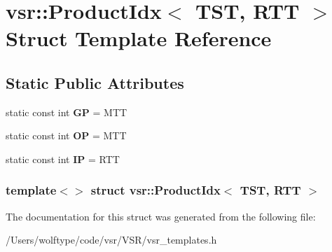 \hypertarget{structvsr_1_1_product_idx_3_01_t_s_t_00_01_r_t_t_01_4}{\section{vsr\-:\-:Product\-Idx$<$ T\-S\-T, R\-T\-T $>$ Struct Template Reference}
\label{structvsr_1_1_product_idx_3_01_t_s_t_00_01_r_t_t_01_4}
}
\subsection*{Static Public Attributes}
\begin{DoxyCompactItemize}
\item 
\hypertarget{structvsr_1_1_product_idx_3_01_t_s_t_00_01_r_t_t_01_4_a0a292b51b55583fc301d120e82985b65}{static const int {\bfseries G\-P} = M\-T\-T}\label{structvsr_1_1_product_idx_3_01_t_s_t_00_01_r_t_t_01_4_a0a292b51b55583fc301d120e82985b65}

\item 
\hypertarget{structvsr_1_1_product_idx_3_01_t_s_t_00_01_r_t_t_01_4_a2d4577cb25bcab188306510015ed4371}{static const int {\bfseries O\-P} = M\-T\-T}\label{structvsr_1_1_product_idx_3_01_t_s_t_00_01_r_t_t_01_4_a2d4577cb25bcab188306510015ed4371}

\item 
\hypertarget{structvsr_1_1_product_idx_3_01_t_s_t_00_01_r_t_t_01_4_a00322c7c9378b34ee87c743900a97aea}{static const int {\bfseries I\-P} = R\-T\-T}\label{structvsr_1_1_product_idx_3_01_t_s_t_00_01_r_t_t_01_4_a00322c7c9378b34ee87c743900a97aea}

\end{DoxyCompactItemize}
\subsubsection*{template$<$$>$ struct vsr\-::\-Product\-Idx$<$ T\-S\-T, R\-T\-T $>$}



The documentation for this struct was generated from the following file\-:\begin{DoxyCompactItemize}
\item 
/\-Users/wolftype/code/vsr/\-V\-S\-R/vsr\-\_\-templates.\-h\end{DoxyCompactItemize}

